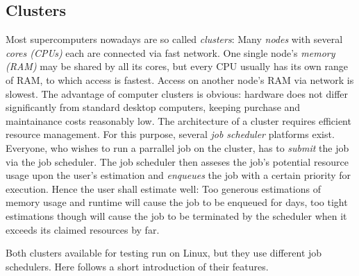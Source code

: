 \documentclass[11.5pt,a4paper]{article}
\begin{document}
\subsection{Clusters}
\label{sec-clusters}
Most supercomputers nowadays are so called \emph{clusters}: Many \emph{nodes} with several \emph{cores (CPUs)} each are connected via fast network. One single node's \emph{memory (RAM)} may be shared by all its cores, but every CPU usually has its own range of RAM, to which access is fastest. Access on another node's RAM via network is slowest. The advantage of computer clusters is obvious: hardware does not differ significantly from standard desktop computers, keeping purchase and maintainance costs reasonably low. 
The architecture of a cluster requires efficient resource management. For this purpose, several \emph{job scheduler} platforms exist. Everyone, who wishes to run a parrallel job on the cluster, has to \emph{submit} the job via the job scheduler. The job scheduler then asseses the job's potential resource usage upon the user's estimation and \emph{enqueues} the job with a certain priority for execution. Hence the user shall estimate well: Too generous estimations of memory usage and runtime will cause the job to be enqueued for days, too tight estimations though will cause the job to be terminated by the scheduler when it exceeds its claimed resources by far. 

Both clusters available for testing run on Linux, but they use different job schedulers. Here follows a short introduction of their features. 
\end{document}
